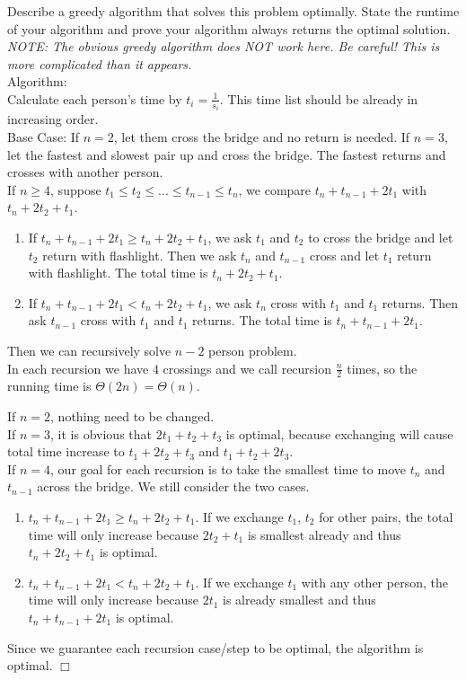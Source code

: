 \documentclass[10pt]{article}
\newenvironment{proof}{\par\noindent{\it Proof.}\hspace*{1em}}{$\Box$\bigskip}
\begin{document}
    Describe a greedy algorithm that solves this problem optimally. State the runtime of your algorithm and prove your algorithm always returns the optimal solution. \emph{NOTE: The obvious greedy algorithm does NOT work here. Be careful! This is more complicated than it appears.}
    \\
    Algorithm:\\
    Calculate each person's time by $t_i = \frac{1}{s_i}$. This time list should be already in increasing order. \\
    Base Case: If $n=2$, let them cross the bridge and no return is needed. If $n=3$, let the fastest and slowest pair up and cross the bridge. The fastest returns and crosses with another person.\\
    If $n \geq 4$, suppose $t_1 \leq t_2\leq ... \leq t_{n-1} \leq t_n$, we compare $t_n+t_{n-1}+2t_1$ with $t_n+2t_2+t_1$. 
    \begin{enumerate}
        \item  If $t_n+t_{n-1}+2t_1 \geq t_n+2t_2+t_1$, we ask $t_1$ and $t_2$ to cross the bridge and let $t_2$ return with flashlight. Then we ask $t_n$ and $t_{n-1}$ cross and let $t_1$ return with flashlight. The total time is $t_n+2t_2+t_1$.
        \item If $t_n+t_{n-1}+2t_1 < t_n+2t_2+t_1$, we ask $t_n$ cross with $t_1$ and $t_1$ returns. Then ask $t_{n-1}$ cross with $t_1$ and $t_1$ returns. The total time is $t_n+t_{n-1}+2t_1$.
    \end{enumerate}
    Then we can recursively solve $n-2$ person problem.\\
    In each recursion we have $4$ crossings and we call recursion $\frac{n}{2}$ times, so the running time is $\Theta(2n)=\Theta(n)$.
    \begin{proof}
    If $n=2$, nothing need to be changed.\\
    If $n=3$, it is obvious that $2t_1+t_2+t_3$ is optimal, because exchanging will cause total time increase to $t_1+2t_2+t_3$ and $t_1+t_2+2t_3$.\\
    If $n=4$, our goal for each recursion is to take the smallest time to move $t_n$ and $t_{n-1}$ across the bridge. We still consider the two cases. 
    \begin{enumerate}
        \item $t_n+t_{n-1}+2t_1 \geq t_n+2t_2+t_1$. If we exchange $t_1$, $t_2$ for other pairs, the total time will only increase because $2t_2+t_1$ is smallest already and thus $t_n+2t_2+t_1$ is optimal. \item $t_n+t_{n-1}+2t_1 < t_n+2t_2+t_1$. If we exchange $t_1$ with any other person, the time will only increase because $2t_1$ is already smallest and thus $t_n+t_{n-1}+2t_1$ is optimal.
    \end{enumerate}
    Since we guarantee each recursion case/step to be optimal, the algorithm is optimal.
    \end{proof}
\end{document}
